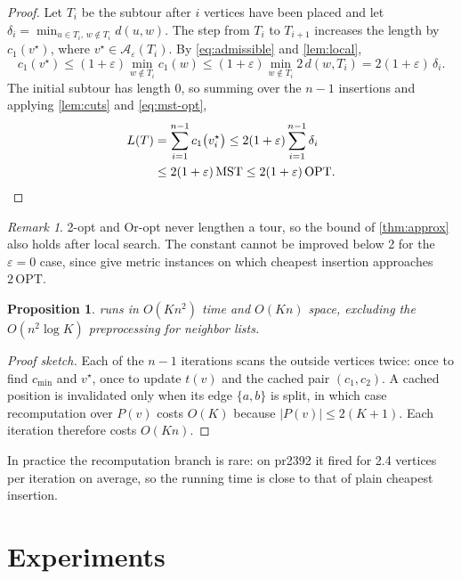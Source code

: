 \documentclass[11pt]{article}
\newtheorem{proposition}{Proposition}
\theoremstyle{definition}
\theoremstyle{remark}
\newtheorem{remark}{Remark}
\newcommand{\OPT}{\mathrm{OPT}}
\newcommand{\MST}{\mathrm{MST}}
\begin{document}
\begin{proof}
Let $T_i$ be the subtour after $i$ vertices have been placed and let $\delta_i = \min_{u \in T_i,\, w \notin T_i} d(u, w)$. The step from $T_i$ to $T_{i+1}$ increases the length by $c_1(v^\star)$, where $v^\star \in \mathcal{A}_\varepsilon(T_i)$. By \eqref{eq:admissible} and \cref{lem:local},
\[
  c_1(v^\star) \le (1+\varepsilon) \min_{w \notin T_i} c_1(w) \le (1+\varepsilon) \min_{w \notin T_i} 2\, d(w, T_i) = 2(1+\varepsilon)\, \delta_i.
\]
The initial subtour has length $0$, so summing over the $n-1$ insertions and applying \cref{lem:cuts} and \eqref{eq:mst-opt},
\begin{align}
  L(T) &= \sum_{i=1}^{n-1} c_1\bigl(v^\star_i\bigr) \le 2(1+\varepsilon) \sum_{i=1}^{n-1} \delta_i \notag \\
       &\le 2(1+\varepsilon)\, \MST \le 2(1+\varepsilon)\, \OPT. \qedhere
\end{align}
\end{proof}

\begin{remark}
2-opt and Or-opt never lengthen a tour, so the bound of \cref{thm:approx} also holds after local search. The constant cannot be improved below 2 for the $\varepsilon = 0$ case, since \citet{rosenkrantz1977} give metric instances on which cheapest insertion approaches $2\,\OPT$.
\end{remark}

\begin{proposition}
\label{prop:runtime}
 runs in $O(Kn^2)$ time and $O(Kn)$ space, excluding the $O(n^2 \log K)$ preprocessing for neighbor lists.
\end{proposition}

\begin{proof}[Proof sketch]
Each of the $n - 1$ iterations scans the outside vertices twice: once to find $c_{\min}$ and $v^\star$, once to update $t(v)$ and the cached pair $(c_1, c_2)$. A cached position is invalidated only when its edge $\{a, b\}$ is split, in which case recomputation over $P(v)$ costs $O(K)$ because $|P(v)| \le 2(K+1)$. Each iteration therefore costs $O(Kn)$.
\end{proof}

In practice the recomputation branch is rare: on pr2392 it fired for 2.4 vertices per iteration on average, so the running time is close to that of plain cheapest insertion.

\section{Experiments}
\label{sec:experiments}
\end{document}
